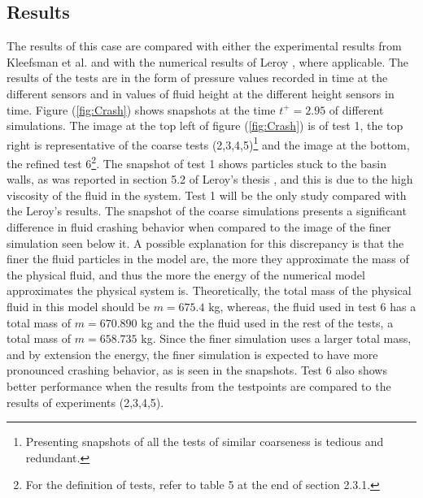 \documentclass{../GPUSPHtemplate}
\begin{document}
\begin{itemize}
\vspace{20pt}
   
\end{itemize}

\subsection{Results}

The results of this case are compared with either the experimental results from Kleefsman et al. \citep{Kleefsman} and with the numerical results of Leroy \citep{AgnesLeroy}, where applicable. The results of the tests are in the form of pressure values recorded in time at the different sensors and in values of fluid height at the different height sensors in time. Figure (\ref{fig:Crash}) shows snapshots at the time $t^+=2.95$ of different simulations. The image at the top left of figure (\ref{fig:Crash}) is of test 1, the top right is representative of the coarse tests (2,3,4,5)\footnote{Presenting snapshots of all the tests of similar coarseness is tedious and redundant.} and the image at the bottom, the refined test 6\footnote{For the definition of tests, refer to table 5 at the end of section 2.3.1.}. The snapshot of test 1 shows particles stuck to the basin walls, as was reported in section 5.2 of Leroy's thesis \citep{AgnesLeroy}, and this is due to the high viscosity of the fluid in the system. Test 1 will be the only study compared with the Leroy's results. The snapshot of the coarse simulations presents a significant difference in fluid crashing behavior when compared to the image of the finer simulation seen below it. A possible explanation for this discrepancy is that the finer the fluid particles in the model are, the more they approximate the mass of the physical fluid, and thus the more the energy of the numerical model approximates the physical system is. Theoretically, the total mass of the physical fluid in this model should be $m= 675.4 $ kg, whereas, the fluid used in test 6 has a total mass of $m = 670.890$ kg and the the fluid used in the rest of the tests, a total mass of $m=658.735$ kg. Since the finer simulation uses a larger total mass, and by extension the energy, the finer simulation is expected to have more pronounced crashing behavior, as is seen in the snapshots. Test 6 also shows better performance when the results from the testpoints are compared to the results of experiments (2,3,4,5). 
\end{document}
